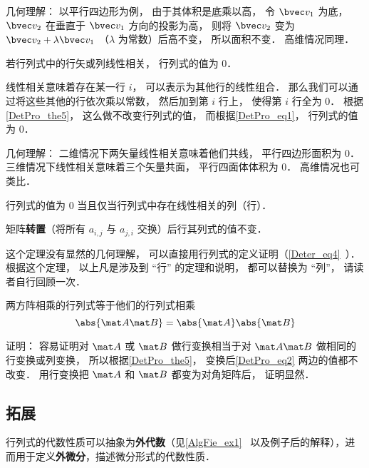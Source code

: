 几何理解： 以平行四边形为例， 由于其体积是底乘以高， 令 $\bvec v_1$ 为底， $\bvec v_2$ 在垂直于 $\bvec v_1$ 方向的投影为高， 则将 $\bvec v_2$ 变为 $\bvec v_2 + \lambda \bvec v_1$ （$\lambda$ 为常数）后高不变， 所以面积不变． 高维情况同理．

\begin{theorem}{ }
若行列式中的行矢或列线性相关， 行列式的值为 0．
\end{theorem}
线性相关意味着存在某一行 $i$， 可以表示为其他行的线性组合． 那么我们可以通过将这些其他的行依次乘以常数， 然后加到第 $i$ 行上， 使得第 $i$ 行全为 0． 根据\autoref{DetPro_the5}， 这么做不改变行列式的值， 而根据\autoref{DetPro_eq1}， 行列式的值为 0．

几何理解： 二维情况下两矢量线性相关意味着他们共线， 平行四边形面积为 0． 三维情况下线性相关意味着三个矢量共面， 平行四面体体积为 0． 高维情况也可类比．

\begin{theorem}{ } \label{DetPro_the2}
行列式的值为 0 当且仅当行列式中存在线性相关的列（行）．
\end{theorem}

\begin{theorem}{ }\label{DetPro_the7}
矩阵\textbf{转置}（将所有 $a_{i,j}$ 与 $a_{j,i}$ 交换）后行其列式的值不变．
\end{theorem}
这个定理没有显然的几何理解， 可以直接用行列式的定义证明（\autoref{Deter_eq4}~）． 根据这个定理， 以上凡是涉及到 “行” 的定理和说明， 都可以替换为 “列”， 请读者自行回顾一次．

\begin{theorem}{}
两方阵相乘的行列式等于他们的行列式相乘
\begin{equation}\label{DetPro_eq2}
\abs{\mat A \mat B} = \abs{\mat A}\abs{\mat B}
\end{equation}
\end{theorem}
证明： 容易证明对 $\mat A$ 或 $\mat B$ 做行变换相当于对 $\mat A\mat B$ 做相同的行变换或列变换， 所以根据\autoref{DetPro_the5}， 变换后\autoref{DetPro_eq2} 两边的值都不改变． 用行变换把 $\mat A$ 和 $\mat B$ 都变为对角矩阵后， 证明显然．

\subsection{拓展}

行列式的代数性质可以抽象为\textbf{外代数}（见\autoref{AlgFie_ex1}~ 以及例子后的解释），进而用于定义\textbf{外微分}，描述微分形式的代数性质．

